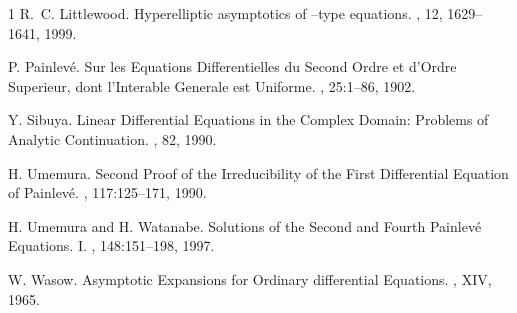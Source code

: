\documentclass{amsart}
\theoremstyle{definition}
\theoremstyle{remark}
\theoremstyle{remark}
\begin{document}
\begin{thebibliography}{1}
R.~C. Littlewood.
\newblock Hyperelliptic asymptotics of \Pa--type equations.
, 12, 1629--1641, 1999.

P. Painlev\'e.
\newblock Sur les Equations Differentielles du Second Ordre et
d'Ordre Superieur, dont l'Interable Generale est Uniforme.
, 25:1--86, 1902.

Y. Sibuya.
\newblock Linear Differential Equations in the Complex Domain: Problems
of Analytic Continuation.
, 82, 1990.

H. Umemura.
\newblock Second Proof of the Irreducibility of the First
Differential Equation of Painlev\'e.
, 117:125--171, 1990.

H. Umemura and H. Watanabe.
\newblock Solutions of the Second and Fourth Painlev\'e Equations. I.
, 148:151--198, 1997.

W. Wasow.
\newblock Asymptotic Expansions for Ordinary differential Equations.
, XIV, 1965.


\end{thebibliography}
\end{document}
